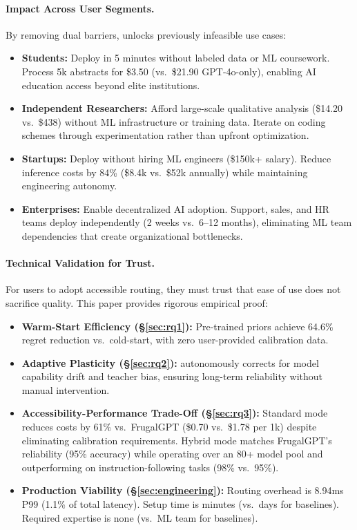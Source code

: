 \paragraph{Impact Across User Segments.} By removing dual barriers, \ours{} unlocks previously infeasible use cases:

\begin{itemize}[leftmargin=*]
    \item \textbf{Students:} Deploy in 5 minutes without labeled data or ML coursework. Process 5k abstracts for \$3.50 (vs.\ \$21.90 GPT-4o-only), enabling AI education access beyond elite institutions.
    \item \textbf{Independent Researchers:} Afford large-scale qualitative analysis (\$14.20 vs.\ \$438) without ML infrastructure or training data. Iterate on coding schemes through experimentation rather than upfront optimization.
    \item \textbf{Startups:} Deploy without hiring ML engineers (\$150k+ salary). Reduce inference costs by 84\% (\$8.4k vs.\ \$52k annually) while maintaining engineering autonomy.
    \item \textbf{Enterprises:} Enable decentralized AI adoption. Support, sales, and HR teams deploy independently (2 weeks vs.\ 6--12 months), eliminating ML team dependencies that create organizational bottlenecks.
\end{itemize}

\paragraph{Technical Validation for Trust.} For users to adopt accessible routing, they must trust that ease of use does not sacrifice quality. This paper provides rigorous empirical proof:

\begin{itemize}[leftmargin=*]
    \item \textbf{Warm-Start Efficiency (\S\ref{sec:rq1}):} Pre-trained priors achieve 64.6\% regret reduction vs.\ cold-start, with zero user-provided calibration data.
    \item \textbf{Adaptive Plasticity (\S\ref{sec:rq2}):} \ours{} autonomously corrects for model capability drift and teacher bias, ensuring long-term reliability without manual intervention.
    \item \textbf{Accessibility-Performance Trade-Off (\S\ref{sec:rq3}):} Standard mode reduces costs by 61\% vs.\ FrugalGPT (\$0.70 vs.\ \$1.78 per 1k) despite eliminating calibration requirements. Hybrid mode matches FrugalGPT's reliability (95\% accuracy) while operating over an 80+ model pool and outperforming on instruction-following tasks (98\% vs.\ 95\%).
    \item \textbf{Production Viability (\S\ref{sec:engineering}):} Routing overhead is 8.94ms P99 (1.1\% of total latency). Setup time is minutes (vs.\ days for baselines). Required expertise is none (vs.\ ML team for baselines).
\end{itemize}


